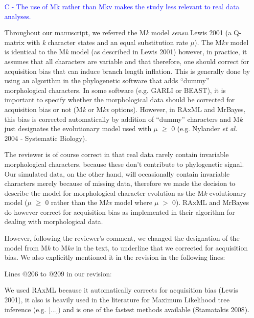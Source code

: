 \documentclass[11pt]{letter}
\begin{document}
\begin{letter}{}
\textcolor{blue}{C - The use of Mk rather than Mkv makes the study less relevant to real data analyses.}

Throughout our manuscript, we referred the M\textit{k} model \textit{sensu} Lewis 2001 (a Q-matrix with \textit{k} character states and an equal substitution rate $\mu$). The M\textit{kv} model is identical to the M\textit{k} model (as described in Lewis 2001) however, in practice, it assumes that all characters are variable and that therefore, one should correct for acquisition bias that can induce branch length inflation. This is generally done by using an algorithm in the phylogenetic software that adds ``dummy'' morphological characters. In some software (e.g. GARLI or BEAST), it is important to specify whether the morphological data should be corrected for acquisition bias or not (M\textit{k} or M\textit{kv} options). However, in RAxML and MrBayes, this bias is corrected automatically by addition of ``dummy'' characters and M\textit{k} just designates the evolutionary model used with $\mu$ $\geq$ 0 (e.g. Nylander \textit{et al.} 2004 - Systematic Biology). 

The reviewer is of course correct in that real data rarely contain invariable morphological characters, because these don't contribute to phylogenetic signal. Our simulated data, on the other hand, will occasionally contain invariable characters merely because of missing data, therefore we made the decision to describe the model for morphological character evolution as the M\textit{k} evolutionary model ($\mu$ $\geq$ 0 rather than the M\textit{kv} model where $\mu$ $>$ 0). RAxML and MrBayes do however correct for acquisition bias as implemented in their algorithm for dealing with morphological data.

However, following the reviewer's comment, we changed the designation of the model from M\textit{k} to M\textit{kv} in the text, to underline that we corrected for acquisition bias. We also explicitly mentioned it in the revision in the following lines:

Lines @206 to @209 in our revision:

\hfill\begin{minipage}{\dimexpr\textwidth-1cm}
We used RAxML because it automatically corrects for acquisition bias (Lewis 2001), it also is heavily used in the literature for Maximum Likelihood tree inference (e.g. [...]) and is one of the fastest methods available (Stamatakis 2008).
\end{minipage}


\end{letter}
\end{document}
